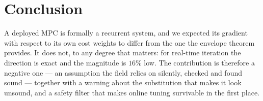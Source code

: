 \documentclass[letterpaper, 10 pt, conference]{ieeeconf}
\begin{document}
\section{Conclusion}

A deployed MPC is formally a recurrent system, and we expected its gradient with
respect to its own cost weights to differ from the one the envelope theorem
provides. It does not, to any degree that matters: for real-time iteration the
direction is exact and the magnitude is $16\%$ low. The contribution is
therefore a negative one --- an assumption the field relies on silently, checked
and found sound --- together with a warning about the substitution that makes it
look unsound, and a safety filter that makes online tuning survivable in the
first place.



\end{document}
